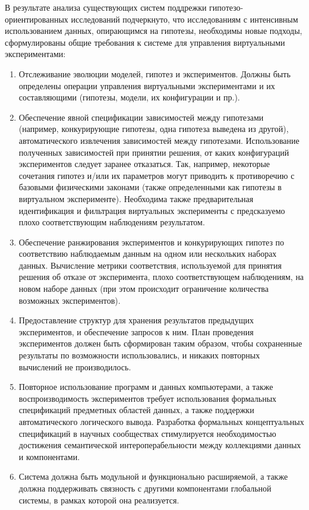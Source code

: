 В результате анализа существующих систем поддрежки гипотезо-ориентированных исследований подчеркнуто, что исследованиям 
с интенсивным использованием данных, опирающимся на гипотезы, необходимы новые подходы, 
сформулированы общие требования к системе для управления виртуальными экспериментами:
\begin{enumerate}
    \item Отслеживание эволюции моделей, гипотез и экспериментов. 
            Должны быть определены операции управления виртуальными экспериментами и их составляющими 
            (гипотезы, модели, их конфигурации и пр.).
    \item Обеспечение явной спецификации зависимостей между гипотезами (например, конкурирующие гипотезы, одна гипотеза 
            выведена из другой), автоматического извлечения зависимостей между гипотезами. Использование полученных 
            зависимостей при принятии решения, от каких конфигураций экспериментов следует заранее 
            отказаться. Так, например, некоторые сочетания гипотез и/или их параметров могут приводить к противоречию с 
            базовыми физическими законами (также определенными как гипотезы в виртуальном эксперименте). Необходима 
            также предварительная идентификация и фильтрация виртуальных эксперименты с предсказуемо плохо 
            соответствующим наблюдениям результатом.
    \item Обеспечение ранжирования экспериментов и конкурирующих гипотез по соответствию наблюдаемым данным на 
            одном или нескольких наборах данных. Вычисление метрики соответствия, используемой для принятия решения об 
            отказе от эксперимента, плохо соответствующем наблюдениям, на новом наборе данных (при этом происходит 
            ограничение количества возможных экспериментов).
    \item Предоставление структур для хранения результатов предыдущих экспериментов, и обеспечение запросов к ним. 
            План проведения экспериментов должен быть сформирован таким образом, чтобы сохраненные результаты по 
            возможности использовались, и никаких повторных вычислений не производилось.
    \item Повторное использование программ и данных компьютерами, а также воспроизводимость экспериментов требует использования формальных спецификаций предметных областей данных, а также 
            поддержки автоматического логического вывода. Разработка формальных концептуальных спецификаций в научных 
            сообществах стимулируется необходимостью достижения семантической интероперабельности между коллекциями 
            данных и компонентами. 
    \item Система должна быть модульной и функционально расширяемой, а также должна поддерживать связность с другими 
            компонентами глобальной системы, в рамках которой она реализуется.
\end{enumerate}

